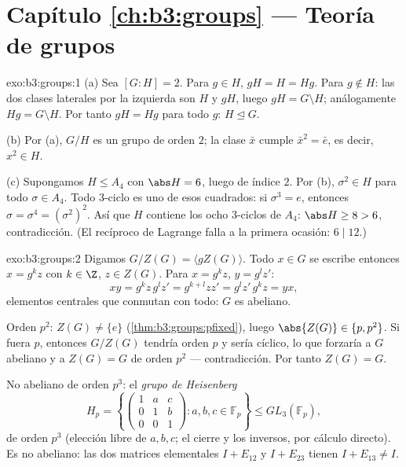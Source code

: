 \section*{Capítulo \ref{ch:b3:groups} --- Teoría de grupos}

\begin{solution}{exo:b3:groups:1}
(a) Sea $[G:H] = 2$. Para $g \in H$, $gH = H = Hg$. Para $g \notin
H$: las dos clases laterales por la izquierda son $H$ y $gH$, luego
$gH = G \setminus H$; análogamente $Hg = G \setminus H$. Por tanto
$gH = Hg$ para todo $g$: $H
\trianglelefteq G$.

(b) Por (a), $G/H$ es un grupo de orden $2$; la clase $\bar x$ cumple
$\bar x^2 = \bar e$, es decir, $x^2 \in H$.

(c) Supongamos $H \leq A_4$ con $\abs H = 6$, luego de índice $2$. Por
(b), $\sigma^2 \in H$ para todo $\sigma \in A_4$. Todo $3$-ciclo es uno
de esos cuadrados: si $\sigma^3 = e$, entonces $\sigma =
\sigma^4 = (\sigma^2)^2$. Así que $H$ contiene los ocho $3$-ciclos de
$A_4$: $\abs H \geq 8 > 6$, contradicción. (El recíproco de Lagrange
falla a la primera ocasión: $6 \mid 12$.)
\end{solution}

\begin{solution}{exo:b3:groups:2}
Digamos $G/Z(G) = \langle gZ(G) \rangle$. Todo $x \in G$ se escribe
entonces $x = g^k z$ con $k \in \Z$, $z \in Z(G)$. Para $x = g^kz$, $y =
g^l z'$:
\[
xy = g^k z\, g^l z' = g^{k+l} z z' = g^l z'\, g^k z = yx,
\]
elementos centrales que conmutan con todo: $G$ es abeliano.

Orden $p^2$: $Z(G) \neq \{e\}$ (\cref{thm:b3:groups:pfixed}), luego
$\abs{Z(G)} \in \{p, p^2\}$. Si fuera $p$, entonces $G/Z(G)$ tendría
orden $p$ y sería cíclico, lo que forzaría a $G$ abeliano y a $Z(G) =
G$ de orden $p^2$ --- contradicción. Por tanto $Z(G) = G$.

No abeliano de orden $p^3$: el \emph{grupo de Heisenberg}
\[
H_p = \left\{ \begin{pmatrix} 1 & a & c\\ 0 & 1 & b\\ 0 & 0 & 1
\end{pmatrix} : a, b, c \in \mathbb F_p \right\}
\leq GL_3(\mathbb F_p),
\]
de orden $p^3$ (elección libre de $a, b, c$; el cierre y los inversos,
por cálculo directo). Es no abeliano: las dos matrices elementales
$I + E_{12}$ y $I + E_{23}$ tienen
 $I + E_{13} \neq I$.
\end{solution}

